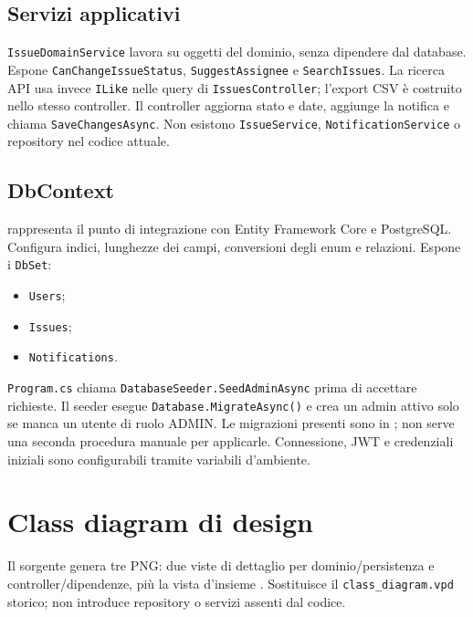 \documentclass[12pt,a4paper]{article}
\begin{document}
\subsection{Servizi applicativi}

\texttt{IssueDomainService} lavora su oggetti del dominio, senza dipendere dal database. Espone \texttt{CanChangeIssueStatus}, \texttt{SuggestAssignee} e \texttt{SearchIssues}. La ricerca API usa invece \texttt{ILike} nelle query di \texttt{IssuesController}; l'export CSV è costruito nello stesso controller. Il controller aggiorna stato e date, aggiunge la notifica e chiama \texttt{SaveChangesAsync}. Non esistono \texttt{IssueService}, \texttt{NotificationService} o repository nel codice attuale.

\subsection{DbContext}

 rappresenta il punto di integrazione con Entity Framework Core e PostgreSQL. Configura indici, lunghezze dei campi, conversioni degli enum e relazioni. Espone i \texttt{DbSet}:

\begin{itemize}
    \item \texttt{Users};
    \item \texttt{Issues};
    \item \texttt{Notifications}.
\end{itemize}

\texttt{Program.cs} chiama \texttt{DatabaseSeeder.SeedAdminAsync} prima di accettare richieste. Il seeder esegue \texttt{Database.MigrateAsync()} e crea un admin attivo solo se manca un utente di ruolo ADMIN. Le migrazioni presenti sono in ; non serve una seconda procedura manuale per applicarle. Connessione, JWT e credenziali iniziali sono configurabili tramite variabili d'ambiente.

\clearpage
\section{Class diagram di design}

Il sorgente  genera tre PNG: due viste di dettaglio per dominio/persistenza e controller/dipendenze, più la vista d'insieme . Sostituisce il \texttt{class\_diagram.vpd} storico; non introduce repository o servizi assenti dal codice.
\end{document}
